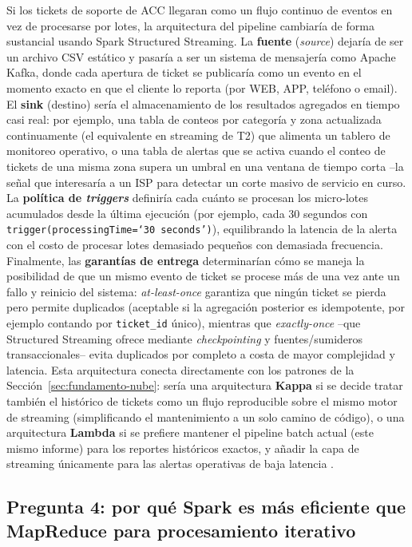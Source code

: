 \documentclass[11pt,a4paper]{article}
\begin{document}
Si los tickets de soporte de ACC llegaran como un flujo continuo de eventos
en vez de procesarse por lotes, la arquitectura del pipeline cambiar\'ia de
forma sustancial usando Spark Structured Streaming. La \textbf{fuente}
(\emph{source}) dejar\'ia de ser un archivo CSV est\'atico y pasar\'ia a ser
un sistema de mensajer\'ia como Apache Kafka, donde cada apertura de ticket
se publicar\'ia como un evento en el momento exacto en que el cliente lo
reporta (por WEB, APP, tel\'efono o email). El \textbf{sink} (destino) ser\'ia
el almacenamiento de los resultados agregados en tiempo casi real: por
ejemplo, una tabla de conteos por categor\'ia y zona actualizada
continuamente (el equivalente en streaming de T2) que alimenta un tablero de
monitoreo operativo, o una tabla de alertas que se activa cuando el conteo de
tickets de una misma zona supera un umbral en una ventana de tiempo corta
--la se\~nal que interesar\'ia a un ISP para detectar un corte masivo de
servicio en curso. La \textbf{pol\'itica de \emph{triggers}} definir\'ia cada
cu\'anto se procesan los micro-lotes acumulados desde la \'ultima ejecuci\'on
(por ejemplo, cada 30 segundos con \texttt{trigger(processingTime=`30
seconds')}), equilibrando la latencia de la alerta con el costo de procesar
lotes demasiado peque\~nos con demasiada frecuencia. Finalmente, las
\textbf{garant\'ias de entrega} determinar\'ian c\'omo se maneja la
posibilidad de que un mismo evento de ticket se procese m\'as de una vez ante
un fallo y reinicio del sistema: \emph{at-least-once} garantiza que ning\'un
ticket se pierda pero permite duplicados (aceptable si la agregaci\'on
posterior es idempotente, por ejemplo contando por \texttt{ticket\_id}
\'unico), mientras que \emph{exactly-once} --que Structured Streaming ofrece
mediante \emph{checkpointing} y fuentes/sumideros transaccionales-- evita
duplicados por completo a costa de mayor complejidad y latencia. Esta
arquitectura conecta directamente con los patrones de la
Secci\'on~\ref{sec:fundamento-nube}: ser\'ia una arquitectura \textbf{Kappa}
si se decide tratar tambi\'en el hist\'orico de tickets como un flujo
reproducible sobre el mismo motor de streaming (simplificando el
mantenimiento a un solo camino de c\'odigo), o una arquitectura
\textbf{Lambda} si se prefiere mantener el pipeline batch actual (este mismo
informe) para los reportes hist\'oricos exactos, y a\~nadir la capa de
streaming \'unicamente para las alertas operativas de baja latencia
\cite{mell2011,zaharia2016}.

\subsection*{Pregunta 4: por qu\'e Spark es m\'as eficiente que MapReduce para procesamiento iterativo}
\end{document}
